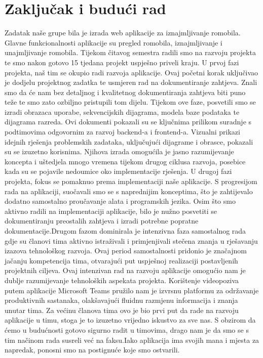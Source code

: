 \chapter{Zaključak i budući rad}
		
		\indent Zadatak naše grupe bila je izrada web aplikacije za iznajmljivanje romobila. Glavne funkcionalnosti aplikacije su pregled romobila, iznajmljivanje i unajmljivanje romobila. Tijekom čitavog semestra radili smo na razvoju projekta te smo nakon gotovo 15 tjedana projekt uspješno priveli kraju.\newline
		\indent U prvoj fazi projekta, naš tim se okupio radi razvoja aplikacije. Ovaj početni korak uključivao je dodjelu projektnog zadatka te usmjeren rad na dokumentiranje zahtjeva. Znali smo da će nam bez detaljnog i kvalitetnog dokumentiranja zahtjeva biti puno teže te smo zato ozbiljno pristupili tom dijelu. Tijekom ove faze, posvetili smo se izradi obrazaca uporabe, sekvencijskih dijagrama, modela baze podataka te dijagrama razreda. Ovi dokumenti pokazali su se ključnima prilikom suradnje s podtimovima odgovornim za razvoj backend-a i frontend-a. Vizualni prikazi idejnih rješenja problemskih zadataka, uključujući dijagrame i obrasce, pokazali su se izuzetno korisnima. Njihova izrada omogućila je jasno razumijevanje koncepta i uštedjela mnogo vremena tijekom drugog ciklusa razvoja, posebice kada su se pojavile nedoumice oko implementacije rješenja.\newline
		\indent U drugoj fazi projekta, fokus se pomaknuo prema implementaciji naše aplikacije. S progresijom rada na aplikaciji, suočavali smo se s naprednijim konceptima, što je zahtijevalo dodatno samostalno proučavanje alata i programskih jezika. Osim što smo aktivno radili na implementaciji aplikacije, bilo je nužno posvetiti se dokumentiranju preostalih zahtjeva i izradi potrebne popratne dokumentacije.Drugom fazom dominirala je intenzivna faza samostalnog rada gdje su članovi tima aktivno istraživali i primjenjivali stečena znanja u rješavanju izazova tehnološkog razvoja. Ovaj period samostalnosti pridonio je značajnom jačanju kompetencija tima, otvarajući put uspješnoj realizaciji postavljenih projektnih ciljeva. Ovaj intenzivan rad na razvoju aplikacije omogućio nam je dublje razumijevanje tehnoloških aspekata projekta.\newline
		\indent Korištenje videopoziva putem aplikacije Microsoft Teams pružilo nam je izvrsnu platformu za održavanje produktivnih sastanaka, olakšavajući fluidnu razmjenu informacija i znanja unutar tima.\newline
		\indent Za većinu članova tima ovo je bio prvi put da rade na razvoju aplikacije u timu, stoga je to izuzetno vrijedno iskustvo za sve nas. S obzirom da ćemo u budućnosti gotovo sigurno radit u timovima, drago nam je da smo se s tim načinom rada susreli već na faksu.Iako aplikacija ima svojih mana i mjesta za napredak, ponosni smo na postignuće koje smo ostvarili. 